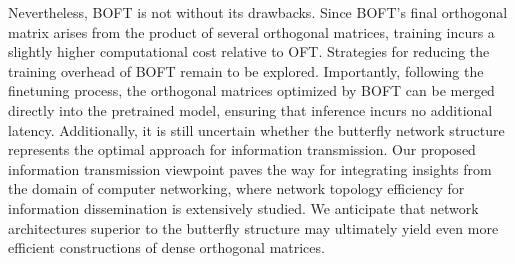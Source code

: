 Nevertheless, BOFT is not without its drawbacks. Since BOFT’s final orthogonal matrix arises from the product of several orthogonal matrices, training incurs a slightly higher computational cost relative to OFT. Strategies for reducing the training overhead of BOFT remain to be explored. Importantly, following the finetuning process, the orthogonal matrices optimized by BOFT can be merged directly into the pretrained model, ensuring that inference incurs no additional latency. Additionally, it is still uncertain whether the butterfly network structure represents the optimal approach for information transmission. Our proposed information transmission viewpoint paves the way for integrating insights from the domain of computer networking, where network topology efficiency for information dissemination is extensively studied. We anticipate that network architectures superior to the butterfly structure may ultimately yield even more efficient constructions of dense orthogonal matrices.

